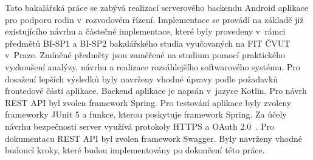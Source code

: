 %
%
Tato bakalářská práce se zabývá realizací serverového backendu Android aplikace pro podporu rodin v~rozvodovém řízení. Implementace se provádí na základě již existujícího návrhu a částečné implementace, které byly provedeny v~rámci předmětů BI-SP1 a BI-SP2 bakalářského studia vyučovaných na FIT ČVUT v~Praze. Zmíněné předměty jsou zaměřené na studium pomocí praktického vyzkoušení analýzy, návrhu a realizace rozsáhlejšího softwarového systému. Pro dosažení lepších výsledků byly navrženy vhodné úpravy podle požadavků frontedové části aplikace. Backend aplikace je napsán v~jazyce Kotlin. Pro návrh REST API byl zvolen framework Spring. Pro testování aplikace byly zvoleny frameworky JUnit 5 a funkce, kterou poskytuje framework Spring. Za účely návrhu bezpečnosti server využívá protokoly HTTPS a OAuth 2.0~. Pro dokumentacu REST API byl zvolen framework Swagger. Byly navrženy vhodné budoucí kroky, které budou implementovány po dokončení této práce.